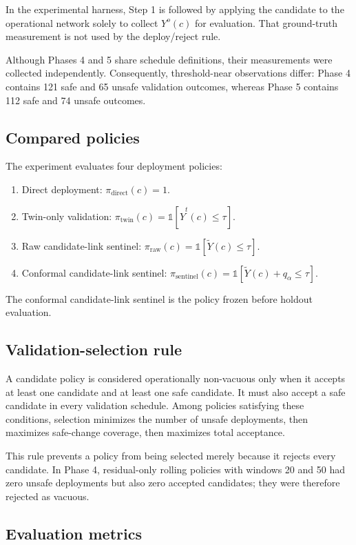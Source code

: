 In the experimental harness, Step 1 is followed by applying the candidate to the operational network solely to collect $Y^o(c)$ for evaluation. That ground-truth measurement is not used by the deploy/reject rule.

Although Phases 4 and 5 share schedule definitions, their measurements were collected independently. Consequently, threshold-near observations differ: Phase 4 contains 121 safe and 65 unsafe validation outcomes, whereas Phase 5 contains 112 safe and 74 unsafe outcomes.

\subsection{Compared policies}

The experiment evaluates four deployment policies:
\begin{enumerate}
\item Direct deployment: $\pi_{\mathrm{direct}}(c)=1$.
\item Twin-only validation: $\pi_{\mathrm{twin}}(c)=\mathbb{1}[\widehat{Y}^{t}(c)\le\tau]$.
\item Raw candidate-link sentinel: $\pi_{\mathrm{raw}}(c)=\mathbb{1}[\widetilde{Y}(c)\le\tau]$.
\item Conformal candidate-link sentinel: $\pi_{\mathrm{sentinel}}(c)=\mathbb{1}[\widetilde{Y}(c)+q_\alpha\le\tau]$.
\end{enumerate}
The conformal candidate-link sentinel is the policy frozen before holdout evaluation.

\subsection{Validation-selection rule}

A candidate policy is considered operationally non-vacuous only when it accepts at least one candidate and at least one safe candidate. It must also accept a safe candidate in every validation schedule. Among policies satisfying these conditions, selection minimizes the number of unsafe deployments, then maximizes safe-change coverage, then maximizes total acceptance.

This rule prevents a policy from being selected merely because it rejects every candidate. In Phase 4, residual-only rolling policies with windows 20 and 50 had zero unsafe deployments but also zero accepted candidates; they were therefore rejected as vacuous.

\subsection{Evaluation metrics}

